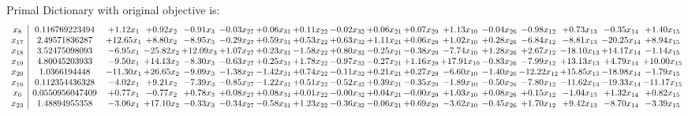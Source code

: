 \documentclass[9pt]{article}
\begin{document}
Primal Dictionary with original objective is:
\[\begin{array}{c| c c@{\hskip 2pt} c@{\hskip 2pt} c@{\hskip 2pt} c@{\hskip 2pt} c@{\hskip 2pt} c@{\hskip 2pt} c@{\hskip 2pt} c@{\hskip 2pt} c@{\hskip 2pt} c@{\hskip 2pt} c@{\hskip 2pt} c@{\hskip 2pt} c@{\hskip 2pt} c@{\hskip 2pt} c@{\hskip 2pt} }
 x_{8}   &  0.116769223494 & +  1.12 x_{1} & +  0.92 x_{2} & -0.91 x_{3} & -0.03 x_{27} & +  0.06 x_{31} & +  0.11 x_{22} & -0.02 x_{32} & +  0.06 x_{21} & +  0.07 x_{29} & +  1.13 x_{10} & -0.04 x_{26} & -0.98 x_{12} & +  0.73 x_{13} & -0.35 x_{14} & +  1.40 x_{15}\\
 x_{17}   &  2.49571836287 & + 12.65 x_{1} & +  8.80 x_{2} & -8.95 x_{3} & -0.29 x_{27} & +  0.59 x_{31} & +  0.53 x_{22} & +  0.63 x_{32} & +  1.11 x_{21} & +  0.06 x_{29} & +  1.02 x_{10} & +  0.28 x_{26} & -6.84 x_{12} & -8.81 x_{13} & -20.25 x_{14} & +  8.94 x_{15}\\
 x_{18}   &  3.52475098093 & -6.95 x_{1} & -25.82 x_{2} & + 12.09 x_{3} & +  1.07 x_{27} & +  0.23 x_{31} & -1.58 x_{22} & +  0.80 x_{32} & -0.25 x_{21} & -0.38 x_{29} & -7.74 x_{10} & +  1.28 x_{26} & +  2.67 x_{12} & -18.10 x_{13} & + 14.17 x_{14} & -1.14 x_{15}\\
 x_{19}   &  4.80045203933 & -9.50 x_{1} & + 14.13 x_{2} & -8.30 x_{3} & -0.63 x_{27} & +  0.25 x_{31} & +  1.78 x_{22} & -0.97 x_{32} & -0.27 x_{21} & +  1.16 x_{29} & + 17.91 x_{10} & -0.83 x_{26} & -7.99 x_{12} & + 13.13 x_{13} & +  4.79 x_{14} & + 10.00 x_{15}\\
 x_{20}   &  1.0366194448 & -11.30 x_{1} & + 26.65 x_{2} & -9.09 x_{3} & -1.38 x_{27} & -1.42 x_{31} & +  0.74 x_{22} & -0.11 x_{32} & +  0.21 x_{21} & +  0.27 x_{29} & -6.60 x_{10} & -1.40 x_{26} & -12.22 x_{12} & + 15.85 x_{13} & -18.98 x_{14} & -1.79 x_{15}\\
 x_{16}   &  0.112354436328 & -4.02 x_{1} & +  9.21 x_{2} & -7.39 x_{3} & -0.85 x_{27} & -1.22 x_{31} & +  0.51 x_{22} & -0.52 x_{32} & +  0.39 x_{21} & -0.35 x_{29} & -1.89 x_{10} & -0.50 x_{26} & -7.80 x_{12} & -11.62 x_{13} & -19.33 x_{14} & -11.17 x_{15}\\
 x_{6}   &  0.0550956047409 & +  0.77 x_{1} & -0.77 x_{2} & +  0.78 x_{3} & +  0.08 x_{27} & +  0.08 x_{31} & +  0.01 x_{22} & -0.00 x_{32} & +  0.04 x_{21} & -0.00 x_{29} & +  1.03 x_{10} & +  0.08 x_{26} & +  0.15 x_{12} & -1.04 x_{13} & +  1.32 x_{14} & +  0.82 x_{15}\\
 x_{23}   &  1.48894955358 & -3.06 x_{1} & + 17.10 x_{2} & -0.33 x_{3} & -0.34 x_{27} & -0.58 x_{31} & +  1.23 x_{22} & -0.36 x_{32} & -0.06 x_{21} & +  0.69 x_{29} & -3.62 x_{10} & -0.45 x_{26} & +  1.70 x_{12} & +  9.42 x_{13} & -8.70 x_{14} & -3.39 x_{15}\\

\end{array}\]
\end{document}
